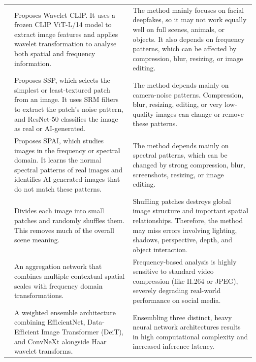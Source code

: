 \documentclass[sn-mathphys-num,Numbered,pdflatex]{sn-jnl}
\begin{document}
\begin{table}[htbp]
\begin{tabularx}{\columnwidth}{@{}p{} X X@{}}
\cite{WaveletdrivenGeneralizable29} & Proposes Wavelet-CLIP. It uses a frozen CLIP ViT-L/14 model to extract image features and applies wavelet transformation to analyse both spatial and frequency information. & The method mainly focuses on facial deepfakes, so it may not work equally well on full scenes, animals, or objects. It also depends on frequency patterns, which can be affected by compression, blur, resizing, or image editing. \\
\cite{ASingle32} & Proposes SSP, which selects the simplest or least-textured patch from an image. It uses SRM filters to extract the patch's noise pattern, and ResNet-50 classifies the image as real or AI-generated. & The method depends mainly on camera-noise patterns. Compression, blur, resizing, editing, or very low-quality images can change or remove these patterns. \\
\cite{AnyresolutionAigenerated33} & Proposes SPAI, which studies images in the frequency or spectral domain. It learns the normal spectral patterns of real images and identifies AI-generated images that do not match these patterns. & The method depends mainly on spectral patterns, which can be changed by strong compression, blur, screenshots, resizing, or image editing. \\
\cite{BreakingSemantic34} & Divides each image into small patches and randomly shuffles them. This removes much of the overall scene meaning. & Shuffling patches destroys global image structure and important spatial relationships. Therefore, the method may miss errors involving lighting, shadows, perspective, depth, and object interaction. \\
\cite{MultipleContexts52} & An aggregation network that combines multiple contextual spatial scales with frequency domain transformations. & Frequency-based analysis is highly sensitive to standard video compression (like H.264 or JPEG), severely degrading real-world performance on social media. \\
\cite{CaenetGeneralized55} & A weighted ensemble architecture combining EfficientNet, Data-Efficient Image Transformer (DeiT), and ConvNeXt alongside Haar wavelet transforms. & Ensembling three distinct, heavy neural network architectures results in high computational complexity and increased inference latency. \\
\bottomrule
\end{tabularx}
\end{table}
\FloatBarrier
\end{document}
